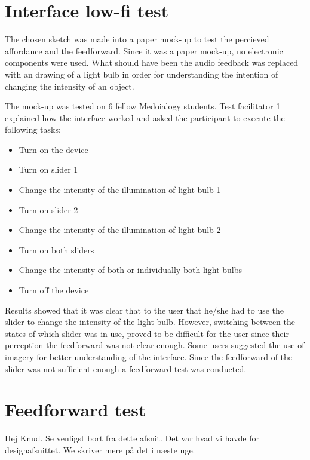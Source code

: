 \section{Interface low-fi test}
The chosen sketch was made into a paper mock-up to test the  percieved affordance and the  feedforward. Since it was a paper mock-up, no electronic components were used. What should have been the audio feedback was replaced with an drawing of a light bulb in order for understanding the intention of changing the intensity of an object. 

The mock-up was tested on 6 fellow Medoialogy students. Test facilitator 1 explained how the interface worked and asked the participant to execute the following tasks:

\begin{itemize}
\item Turn on the device
\item Turn on slider 1
\item Change the intensity of the illumination of light bulb 1
\item Turn on slider 2
\item Change the intensity of the illumination of light bulb 2
\item Turn on both sliders
\item Change the intensity of both or individually both light bulbs
\item Turn off the device
\end{itemize}


Results showed that it was clear that to the user that he/she had to use the slider to change the intensity of the light bulb. However, switching between the states of which slider was in use, proved to be difficult for the user since their perception the feedforward was not clear enough. Some users suggested the use of imagery for better understanding of the interface.
Since the feedforward of the slider was not sufficient enough a feedforward test was conducted.

\section{Feedforward test}
Hej Knud. Se venligst bort fra dette afsnit. Det var hvad vi havde for designafsnittet. We skriver mere på det i næste uge.






